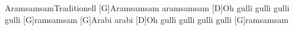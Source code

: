 \documentclass[../main.tex]{subfiles}
\begin{document}
\begin{song}{Aramsamsam}{Traditionell}{}
[G]Aramsamsam aramsamsam
[D]Oh gulli gulli gulli gulli [G]ramsamsam
[G]Arabi arabi
[D]Oh gulli gulli gulli gulli [G]ramsamsam
\end{song}
\end{document}

